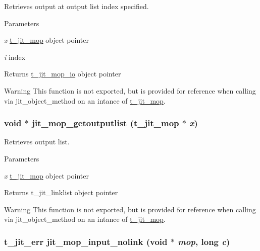 Retrieves output at output list index specified. 
\begin{DoxyParams}{Parameters}
\item[{\em x}]\hyperlink{structt__jit__mop}{t\_\-jit\_\-mop} object pointer \item[{\em i}]index\end{DoxyParams}
\begin{DoxyReturn}{Returns}
\hyperlink{structt__jit__mop__io}{t\_\-jit\_\-mop\_\-io} object pointer
\end{DoxyReturn}
\begin{DoxyWarning}{Warning}
This function is not exported, but is provided for reference when calling via jit\_\-object\_\-method on an intance of \hyperlink{structt__jit__mop}{t\_\-jit\_\-mop}. 
\end{DoxyWarning}
\hypertarget{group__mopmod_gab75982f45862072738e43a9423f2bcd4}{
\subsubsection[{jit\_\-mop\_\-getoutputlist}]{\setlength{\rightskip}{0pt plus 5cm}void $\ast$ jit\_\-mop\_\-getoutputlist ({\bf t\_\-jit\_\-mop} $\ast$ {\em x})}}
\label{group__mopmod_gab75982f45862072738e43a9423f2bcd4}


Retrieves output list. 
\begin{DoxyParams}{Parameters}
\item[{\em x}]\hyperlink{structt__jit__mop}{t\_\-jit\_\-mop} object pointer\end{DoxyParams}
\begin{DoxyReturn}{Returns}
t\_\-jit\_\-linklist object pointer
\end{DoxyReturn}
\begin{DoxyWarning}{Warning}
This function is not exported, but is provided for reference when calling via jit\_\-object\_\-method on an intance of \hyperlink{structt__jit__mop}{t\_\-jit\_\-mop}. 
\end{DoxyWarning}
\hypertarget{group__mopmod_ga3f223fa6414f856e2484dbab7508945f}{
\subsubsection[{jit\_\-mop\_\-input\_\-nolink}]{\setlength{\rightskip}{0pt plus 5cm}t\_\-jit\_\-err jit\_\-mop\_\-input\_\-nolink (void $\ast$ {\em mop}, \/  long {\em c})}}
\label{group__mopmod_ga3f223fa6414f856e2484dbab7508945f}


